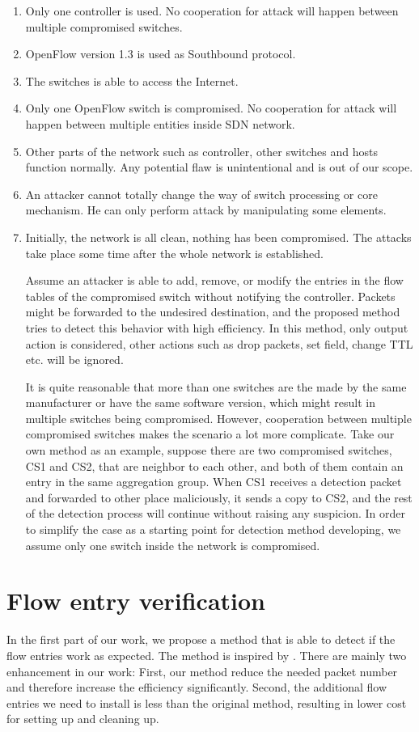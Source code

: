 \begin{enumerate}
\item
Only one controller is used. No cooperation for attack will happen between multiple compromised switches.
\item
OpenFlow version 1.3 is used as Southbound protocol.
\item
The switches is able to access the Internet. 
\item
Only one OpenFlow switch is compromised. No cooperation for attack will happen between multiple entities inside SDN network.
\item
Other parts of the network such as controller, other switches and hosts function normally. Any potential flaw is unintentional and is out of our scope.
\item
An attacker cannot totally change the way of switch processing or core mechanism. He can only perform attack by manipulating some elements.
\item
Initially, the network is all clean, nothing has been compromised. The attacks take place some time after the whole network is established.

Assume an attacker is able to add, remove, or modify the entries in the flow tables of the compromised
switch without notifying the controller. Packets might be forwarded to the undesired destination, and the proposed method tries to detect this behavior with high efficiency. In this method, only output action is considered, other actions such as drop packets, set field, change TTL etc. will be ignored. 

It is quite reasonable that more than one switches are the made by the same manufacturer or have the same software version, which might result in multiple switches being compromised. However, cooperation between multiple compromised switches makes the scenario a lot more complicate. Take our own method as an example, suppose there are two compromised switches, CS1 and CS2, that are neighbor to each other, and both of them contain an entry in the same aggregation group. When CS1 receives a detection packet and forwarded to other place maliciously, it sends a copy to CS2, and the rest of the detection process will continue without raising any suspicion. In order to simplify the case as a starting point for detection method developing, we assume only one switch inside the network is compromised.

\end{enumerate}

\section{Flow entry verification}
In the first part of our work, we propose a method that is able to detect if the flow entries work as expected. The method is inspired by \cite{CKGL15}. There are mainly two enhancement in our work: First, our method reduce the needed packet number and therefore increase the efficiency significantly. Second, the additional flow entries we need to install is less than the original method, resulting in lower cost for setting up and cleaning up. 

